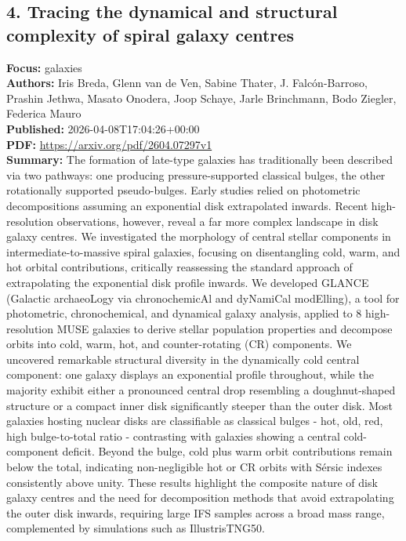 \documentclass[11pt]{article}
\begin{document}
\subsection*{4. Tracing the dynamical and structural complexity of spiral galaxy centres}
\textbf{Focus:} galaxies\\
\textbf{Authors:} Iris Breda, Glenn van de Ven, Sabine Thater, J. Falcón-Barroso, Prashin Jethwa, Masato Onodera, Joop Schaye, Jarle Brinchmann, Bodo Ziegler, Federica Mauro\\
\textbf{Published:} 2026-04-08T17:04:26+00:00\\
\textbf{PDF:} \href{https://arxiv.org/pdf/2604.07297v1}{https://arxiv.org/pdf/2604.07297v1}\\
\textbf{Summary:}
The formation of late-type galaxies has traditionally been described via two pathways: one producing pressure-supported classical bulges, the other rotationally supported pseudo-bulges. Early studies relied on photometric decompositions assuming an exponential disk extrapolated inwards. Recent high-resolution observations, however, reveal a far more complex landscape in disk galaxy centres. We investigated the morphology of central stellar components in intermediate-to-massive spiral galaxies, focusing on disentangling cold, warm, and hot orbital contributions, critically reassessing the standard approach of extrapolating the exponential disk profile inwards. We developed GLANCE (Galactic archaeoLogy via chronochemicAl and dyNamiCal modElling), a tool for photometric, chronochemical, and dynamical galaxy analysis, applied to 8 high-resolution MUSE galaxies to derive stellar population properties and decompose orbits into cold, warm, hot, and counter-rotating (CR) components. We uncovered remarkable structural diversity in the dynamically cold central component: one galaxy displays an exponential profile throughout, while the majority exhibit either a pronounced central drop resembling a doughnut-shaped structure or a compact inner disk significantly steeper than the outer disk. Most galaxies hosting nuclear disks are classifiable as classical bulges - hot, old, red, high bulge-to-total ratio - contrasting with galaxies showing a central cold-component deficit. Beyond the bulge, cold plus warm orbit contributions remain below the total, indicating non-negligible hot or CR orbits with Sérsic indexes consistently above unity. These results highlight the composite nature of disk galaxy centres and the need for decomposition methods that avoid extrapolating the outer disk inwards, requiring large IFS samples across a broad mass range, complemented by simulations such as IllustrisTNG50.
\end{document}
